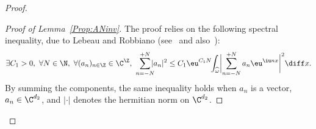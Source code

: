 \begin{proof}
\begin{proof}[Proof of Lemma~\ref{Prop:ANinv}]
The proof relies on the following spectral inequality, due to Lebeau and Robbiano (see~\cite{lebeau_1995} and also~\cite[Th.\,5.4]{lerousseau_2012}):
\begin{equation}\label{eq:spectral}
\exists C_1>0,\ \forall N \in \N,\ \forall (a_n)_{n\in\Z} \in \C^\Z, \
\sum_{n=-N}^{+N}\hspace*{-2mm} |a_n|^2 \leq C_1 \eu^{C_1 N} \hspace*{-1mm}\int_{\widehat{\omega}} \biggl|\sum_{n=-N}^{+N} a_n \eu^{\iu nx}\biggr|^2 \diff x.
\end{equation}
By summing the components, the same inequality holds when $a_n$ is a vector, $a_n \in \C^{d_2}$, and $|\cdot|$ denotes the hermitian norm on $\C^{d_2}$.


\end{proof}
\end{proof}

